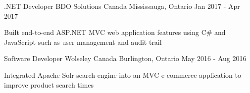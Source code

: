 \begin{cventries}
  \cventry
    {.NET Developer} %
    {BDO Solutions Canada} %
    {Mississauga, Ontario} %
    {Jan 2017 - Apr 2017} %
    {
      \begin{cvitems} %
        \item {Built end-to-end ASP.NET MVC web application features using C\# and JavaScript such as user management and audit trail}
      \end{cvitems}
    }

  \cventry
    {Software Developer} %
    {Wolseley Canada} %
    {Burlington, Ontario} %
    {May 2016 - Aug 2016} %
    {
      \begin{cvitems} %
        \item {Integrated Apache Solr search engine into an MVC e-commerce application to improve product search times}
      \end{cvitems}
    }

\end{cventries}
